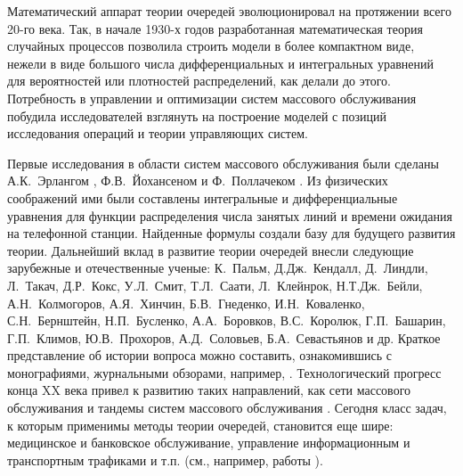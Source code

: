 Математический аппарат теории очередей эволюционировал на протяжении всего 20-го века. Так, в начале 1930-х годов разработанная математическая теория случайных процессов позволила строить модели в более компактном виде, нежели в виде большого числа дифференциальных и интегральных уравнений для вероятностей или плотностей распределений, как делали до этого. Потребность в управлении и оптимизации систем массового обслуживания побудила исследователей взглянуть на построение моделей с позиций исследования операций и теории управляющих систем.


Первые исследования в области систем массового обслуживания были сделаны  А.К.~Эрлангом \cite{Erlang:1909,Erlang:1917}, Ф.В.~Йохансеном \cite{Johannsen} и Ф.~Поллачеком \cite{Pollaczek:1934}. Из физических соображений ими были составлены интегральные и дифференциальные уравнения для функции распределения числа занятых линий  и времени  ожидания на телефонной станции. Найденные формулы создали базу для будущего развития теории. Дальнейший вклад в развитие теории очередей внесли следующие зарубежные и отечественные ученые: К.~Пальм, Д.Дж.~Кендалл, Д.~Линдли, Л.~Такач, Д.Р.~Кокс, У.Л.~Смит, Т.Л.~Саати, Л.~Клейнрок,  Н.Т.Дж.~Бейли,  А.Н.~Колмогоров, А.Я.~Хинчин, Б.В.~Гнеденко, И.Н.~Коваленко,  С.Н.~Бернштейн, Н.П.~Бусленко, А.А.~Боровков, В.С.~Королюк, Г.П.~Башарин, Г.П.~Климов, Ю.В.~Прохоров, А.Д.~Соловьев,  Б.А.~Севастьянов и др. Краткое представление об истории вопроса можно составить, ознакомившись с монографиями, журнальными обзорами, например, \cite{Borovkov, Bocharov:1995, GnedenkoKovalenko, KoksSmith, Kovalenko:1963, asmussen, kalashnikov}. Технологический прогресс конца XX века привел к развитию таких направлений, как сети массового обслуживания и тандемы систем массового обслуживания \cite{ivnickii, jackson, reich}. Сегодня класс задач, к которым применимы методы теории очередей, становится еще шире: медицинское и банковское обслуживание, управление информационным и транспортным трафиками и т.п. (см., например, работы \cite{dudin:2011, farhadov, Haight:1963, haidemann, raghavan, rogiest}).
 
